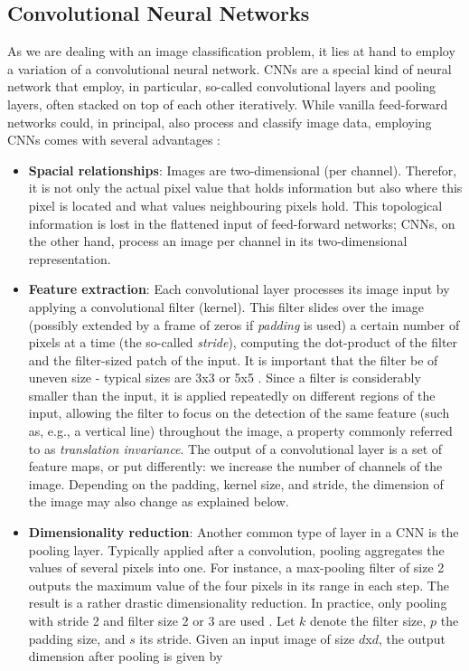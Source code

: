 \documentclass[british,12p]{article}
\begin{document}
    \subsection{Convolutional Neural Networks}\label{secCNN}
    As we are dealing with an image classification problem, it lies at hand to employ a variation of a convolutional neural network. CNNs are a special kind of neural network that employ, in particular, so-called convolutional layers and pooling layers, often stacked on top of each other iteratively. While vanilla feed-forward networks could, in principal, also process and classify image data, employing CNNs comes with several advantages \cites{Krizhevsky:2012, shea:15}:
    \begin{itemize}
    	\item \textbf{Spacial relationships}: Images are two-dimensional	(per channel). Therefor, it is not only the actual pixel value that holds information but also where this pixel is located and what values neighbouring pixels hold. This topological information is lost in the flattened input of feed-forward networks; CNNs, on the other hand, process an image per channel in its two-dimensional representation. 
    	\item \textbf{Feature extraction}: Each convolutional layer processes its image input by applying a convolutional filter (kernel). This filter slides over the image (possibly extended by a frame of zeros if \textit{padding} is used) a certain number of pixels at a time (the so-called \textit{stride}), computing the dot-product of the filter and the filter-sized patch of the input. It is important that the filter be of uneven size - typical sizes are 3x3 or 5x5 \cite[p. 97]{buduma:17}. Since a filter is considerably smaller than the input, it is applied repeatedly on different regions of the input, allowing the filter to focus on the detection of the same feature (such as, e.g., a vertical line) throughout the image, a property commonly referred to as \textit{translation invariance}. The output of a convolutional layer is a set of feature maps, or put differently: we increase the number of channels of the image. Depending on the padding, kernel size, and stride, the dimension of the image may also change as explained below.
    	\item \textbf{Dimensionality reduction}: Another common type of layer in a CNN is the pooling layer. Typically applied after a convolution, pooling aggregates the values of several pixels into one. For instance, a max-pooling filter of size 2 outputs the maximum value of the four pixels in its range in each step. The result is a rather drastic dimensionality reduction. In practice, only pooling with stride 2 and filter size 2 or 3 are used \cite[p. 99]{buduma:17}. Let $k$ denote the filter size, $p$ the padding size, and $s$ its stride. Given an input image of size $d$x$d$, the output dimension after pooling is given by

\end{itemize}
\end{document}

